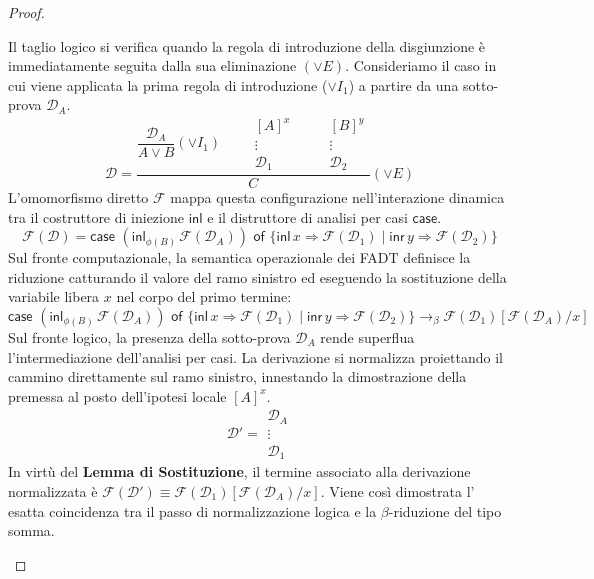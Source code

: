\begin{proof}
\begin{description}[leftmargin=1.5em, style=nextline, font=\bfseries]
        \item[Frammento Somma ($\lor$ / $+$)]
            Il taglio logico si verifica quando la regola di introduzione della disgiunzione è immediatamente seguita dalla sua eliminazione $(\lor E)$. Consideriamo il caso
            in cui viene applicata la prima regola di introduzione ($\lor I_1$) a partire da una sotto-prova $\mathcal{D}_A$.
            \begin{equation*}
                \mathcal{D} = \frac{\dfrac{\mathcal{D}_A}{A \lor B} (\lor I_1) \qquad \begin{array}{c} [A]^x \\ \vdots \\ \mathcal{D}_1 \end{array} \qquad \begin{array}{c} [B]^y \\ \vdots \\ \mathcal{D}_2 \end{array}}{C} (\lor E)
            \end{equation*}
            L'omomorfismo diretto $\mathcal{F}$ mappa questa configurazione nell'interazione dinamica tra il costruttore di iniezione $\mathsf{inl}$ e il distruttore di analisi per casi $\mathsf{case}$.
            $$ \mathcal{F}(\mathcal{D}) = \mathsf{case} \,\, (\mathsf{inl}_{\phi(B)} \, \mathcal{F}(\mathcal{D}_A)) \,\, \mathsf{of} \,\, \{ \mathsf{inl} \, x \Rightarrow \mathcal{F}(\mathcal{D}_1) \mid \mathsf{inr} \, y \Rightarrow \mathcal{F}(\mathcal{D}_2) \} $$
            Sul fronte computazionale, la semantica operazionale dei FADT definisce la riduzione catturando il valore del ramo sinistro ed eseguendo la sostituzione della variabile libera $x$ nel corpo del primo termine:
            $$ \mathsf{case} \,\, (\mathsf{inl}_{\phi(B)} \, \mathcal{F}(\mathcal{D}_A)) \,\, \mathsf{of} \,\, \{ \mathsf{inl} \, x \Rightarrow \mathcal{F}(\mathcal{D}_1) \mid \mathsf{inr} \, y \Rightarrow \mathcal{F}(\mathcal{D}_2) \} \to_\beta \mathcal{F}(\mathcal{D}_1)[\mathcal{F}(\mathcal{D}_A)/x] $$
            Sul fronte logico, la presenza della sotto-prova $\mathcal{D}_A$ rende superflua l'intermediazione dell'analisi per casi. La derivazione si normalizza proiettando il cammino direttamente sul ramo sinistro, innestando la dimostrazione della premessa al posto dell'ipotesi locale $[A]^x$.
            $$ \mathcal{D}' = \begin{array}{c} \mathcal{D}_A \\ \vdots \\ \mathcal{D}_1 \end{array} $$
            In virtù del \textbf{Lemma di Sostituzione}, il termine associato alla derivazione normalizzata è $\mathcal{F}(\mathcal{D}') \equiv \mathcal{F}(\mathcal{D}_1)[\mathcal{F}(\mathcal{D}_A)/x]$. Viene così dimostrata l'
            esatta coincidenza tra il passo di normalizzazione logica e la $\beta$-riduzione del tipo somma.
    \end{description}
\end{proof}


